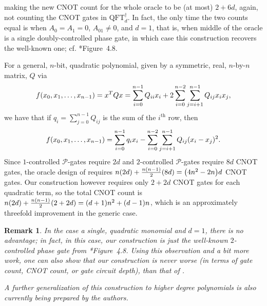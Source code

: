 \documentclass[reqno,oneside,12pt]{amsart}  %
\numberwithin{equation}{section}                %
\let\originalleft\left
\let\originalright\right
\renewcommand{\left}{\mathopen{}\mathclose\bgroup\originalleft}
\renewcommand{\right}{\aftergroup\egroup\originalright}
\def\({\mathopen{}\left(}
\def\){\right)\mathclose{}}
\newtheorem{remark}[theorem]{Remark}
\def\cP{\mathcal{P}}
\def\QFT{\mathrm{QFT}}
\begin{document}
making the new CNOT count for the whole oracle to be (at most) $2 + 6d$, again, not counting the CNOT gates in $\QFT_d^\dagger$. In fact, the only time the two counts equal is when $A_0 = A_1 = 0$, $A_{01} \neq 0$, and $d = 1$, that is, when middle of the oracle is a single doubly-controlled phase gate, in which case this construction recovers the well-known one; cf. \cite{nielsen_quantum_2010}*{Figure~4.8}.

\smallskip

For a general, $n$-bit, quadratic polynomial, given by a symmetric, real, $n$-by-$n$ matrix, $Q$ via
\begin{equation}
   f \( x_0, x_1, \ldots, x_{n - 1} \) = x^T Q x = \sum\limits_{i = 0}^{n - 1} Q_{ii} x_i + 2 \sum\limits_{i = 0}^{n - 2} \sum\limits_{j = i + 1}^{n - 1} Q_{ij} x_i x_j,
\end{equation}
we have that if $q_i = \sum\limits_{j = 0}^{n - 1} Q_{ij}$ is the sum of the $i^{\mathrm{th}}$ row, then
\begin{align}
   f \( x_0, x_1, \ldots, x_{n - 1} \) = \sum\limits_{i = 0}^{n - 1} q_i x_i - \sum\limits_{i = 0}^{n - 2} \sum\limits_{j = i + 1}^{n - 1} Q_{ij} \( x_i - x_j \)^2.
\end{align}
Since $1$-controlled $\cP$-gates require $2d$ and $2$-controlled $\cP$-gates require $8d$ CNOT gates, the oracle design of \cite{gilliam_grover_2021} requires $n \( 2 d \) + \tfrac{n \( n - 1 \)}{2} \( 8 d \) = \( 4 n^2 - 2 n \) d$ CNOT gates. Our construction however requires only $2 + 2d$ CNOT gates for each quadratic term, so the total CNOT count is $n \( 2 d \) + \tfrac{n \( n - 1 \)}{2} \( 2 + 2 d \) = \( d + 1 \) n^2 + \( d - 1\) n$, which is an approximately threefold improvement in the generic case.

\begin{remark}
   In the case a single, quadratic monomial and $d = 1$, there is no advantage; in fact, in this case, our construction is just the well-known $2$-controlled phase gate from \cite{nielsen_quantum_2010}*{Figure~4.8}. Using this observation and a bit more work, one can also show that our construction is never worse (in terms of gate count, CNOT count, or gate circuit depth), than that of \cite{gilliam_grover_2021}.

   A further generalization of this construction to higher degree polynomials is also currently being prepared by the authors.
\end{remark}

\bigskip
\end{document}
